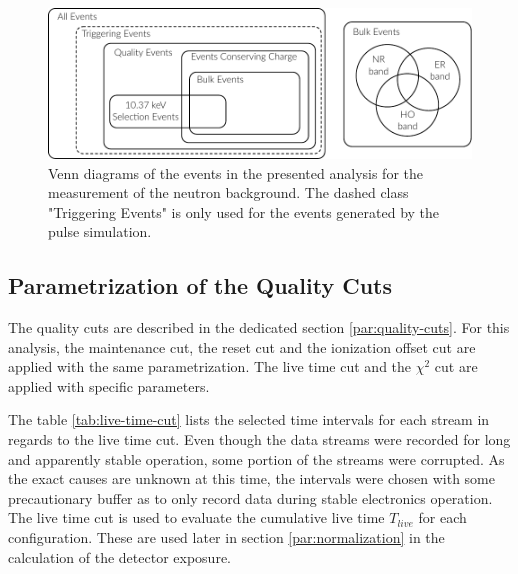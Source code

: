
\begin{figure}
\centering
\includegraphics[scale=1]{Figures/Neutron/cut_venn_diagramm.pdf}
\caption{Venn diagrams of the events in the presented analysis for the measurement of the neutron background. The dashed class "Triggering Events" is only used for the events generated by the pulse simulation.}
\label{fig:cut-venn-diagramm}
\end{figure}


\subsection{Parametrization of the Quality Cuts}
\label{par:param-quality-cuts}

The quality cuts are described in the dedicated section \ref{par:quality-cuts}. For this analysis, the maintenance cut, the reset cut and the ionization offset cut are applied with the same parametrization.
The live time cut and the $\chi^2$ cut are applied with specific parameters. 

The table \ref{tab:live-time-cut} lists the selected time intervals for each stream in regards to the live time cut. Even though the data streams were recorded for long and apparently stable operation, some portion of the streams were corrupted. As the exact causes are unknown at this time, the intervals were chosen with some precautionary buffer as to only record data during stable electronics operation.
The live time cut is used to evaluate the cumulative live time $T_{live}$ for each configuration. These are used later in section \ref{par:normalization} in the calculation of the detector exposure.

